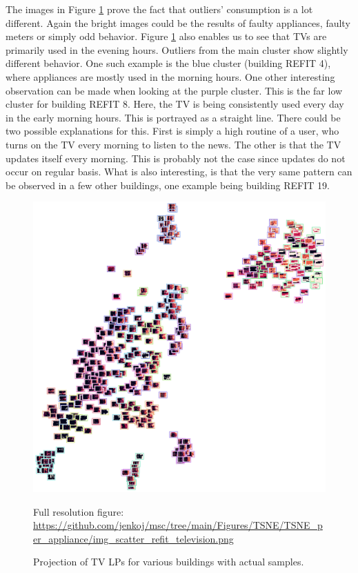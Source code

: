 The images in Figure \ref{fig:tsne_pa_img_scatter_all_tv} prove the fact that outliers' consumption is a lot different.
Again the bright images could be the results of faulty appliances, faulty meters or simply odd behavior.
Figure \ref{fig:tsne_pa_img_scatter_all_tv} also enables us to see that TVs are primarily used 
in the evening hours. Outliers from the main cluster show slightly different behavior. One such 
example is the blue cluster (building REFIT 4), where appliances are mostly used in the morning hours. 
One other interesting observation can be made when looking at the purple cluster. This is the far low cluster for building REFIT 8.
Here, the TV is being consistently used every day in the early morning hours.
This is portrayed as a straight line.
There could be two possible explanations for this.
First is simply a high routine of a user, who turns on the TV every morning to listen to the news.
The other is that the TV updates itself every morning. This is probably not the case since updates do not occur on regular basis.
What is also interesting, is that the very same pattern can be observed in a few other buildings, one example being building REFIT 19.

\begin{figure}[H]
	\centering
	\caption{Projection of TV LPs for various buildings with actual samples.}
	\includegraphics[width=.9\textwidth]{Figures/TSNE/TSNE_per_appliance/img_scatter_refit_television.png}
	\label{fig:tsne_pa_img_scatter_all_tv}
	\par
	\par\footnotesize{Full resolution figure: \url{https://github.com/jenkoj/msc/tree/main/Figures/TSNE/TSNE_per_appliance/img_scatter_refit_television.png}}
\end{figure}

